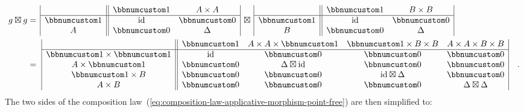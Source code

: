 \begin{align*}
g\boxtimes g & =\,\begin{array}{|c||cc|}
 & \bbnum 1 & A\times A\\
\hline \bbnum 1 & \text{id} & \bbnum 0\\
A & \bbnum 0 & \Delta
\end{array}\,\boxtimes\,\begin{array}{|c||cc|}
 & \bbnum 1 & B\times B\\
\hline \bbnum 1 & \text{id} & \bbnum 0\\
B & \bbnum 0 & \Delta
\end{array}\\
 & =\,\,\begin{array}{|c||cccc|}
 & \bbnum 1 & A\times A\times\bbnum 1 & \bbnum 1\times B\times B & A\times A\times B\times B\\
\hline \bbnum 1\times\bbnum 1 & \text{id} & \bbnum 0 & \bbnum 0 & \bbnum 0\\
A\times\bbnum 1 & \bbnum 0 & \Delta\boxtimes\text{id} & \bbnum 0 & \bbnum 0\\
\bbnum 1\times B & \bbnum 0 & \bbnum 0 & \text{id}\boxtimes\Delta & \bbnum 0\\
A\times B & \bbnum 0 & \bbnum 0 & \bbnum 0 & \Delta\boxtimes\Delta
\end{array}\quad.
\end{align*}
The two sides of the composition law~(\ref{eq:composition-law-applicative-morphism-point-free})
are then simplified to:
